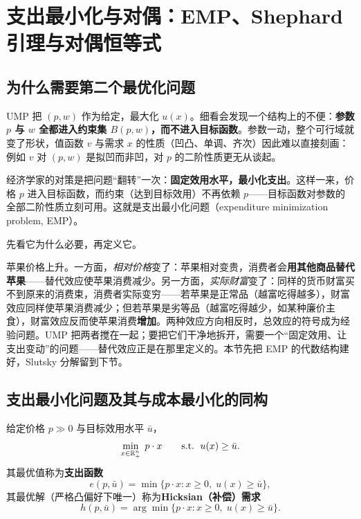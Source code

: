 \section{支出最小化与对偶：EMP、Shephard 引理与对偶恒等式}
\subsection{为什么需要第二个最优化问题}

UMP 把 $(p,w)$ 作为给定，最大化 $u(x)$。细看会发现一个结构上的不便：\textbf{参数 $p$ 与 $w$ 全都进入约束集 $B(p,w)$，而不进入目标函数}。参数一动，整个可行域就变了形状，值函数 $v$ 与需求 $x$ 的性质（凹凸、单调、齐次）因此难以直接刻画：例如 $v$ 对 $(p,w)$ 是拟凹而非凹，对 $p$ 的二阶性质更无从谈起。

经济学家的对策是把问题“翻转”一次：\textbf{固定效用水平，最小化支出}。这样一来，价格 $p$ 进入目标函数，而约束（达到目标效用）不再依赖 $p$——目标函数对参数的全部二阶性质立刻可用。这就是支出最小化问题（expenditure minimization problem, EMP）。

先看它为什么必要，再定义它。

\begin{example}\label{ex:apple}
苹果价格上升。一方面，\emph{相对价格}变了：苹果相对变贵，消费者会\textbf{用其他商品替代苹果}——替代效应使苹果消费减少。另一方面，\emph{实际财富}变了：同样的货币财富买不到原来的消费束，消费者实际变穷——若苹果是正常品（越富吃得越多），财富效应同样使苹果消费减少；但若苹果是劣等品（越富吃得越少，如某种廉价主食），财富效应反而使苹果消费\textbf{增加}。两种效应方向相反时，总效应的符号成为经验问题。UMP 把两者搅在一起；要把它们干净地拆开，需要一个“固定效用、让支出变动”的问题——替代效应正是在那里定义的。本节先把 EMP 的代数结构建好，Slutsky 分解留到下节。
\end{example}

\subsection{支出最小化问题及其与成本最小化的同构}

\begin{definition}[支出最小化问题]\label{def:emp}
给定价格 $p\gg0$ 与目标效用水平 $\bar u$，
\[
 \min_{x\in\mathbb{R}^n_+}\;p\cdot x\qquad\text{s.t.}\ \;u(x)\ge\bar u.
\]
其最优值称为\textbf{支出函数}
\[
 e(p,\bar u)=\min\{p\cdot x:x\ge0,\;u(x)\ge\bar u\},
\]
其最优解（严格凸偏好下唯一）称为\textbf{Hicksian（补偿）需求}
\[
 h(p,\bar u)=\arg\min\{p\cdot x:x\ge0,\;u(x)\ge\bar u\}.
\]
\end{definition}

